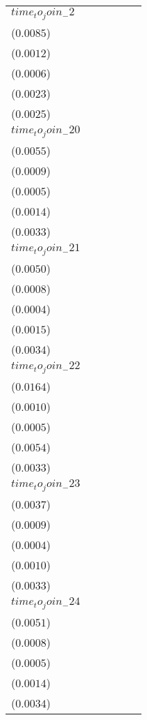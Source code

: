 \begin{tabular}{llllll}
$time_to_join_-2$  &   \makecell{$0.0022^{}$ \\ ($0.0085$)} &  \makecell{$-0.0002^{}$ \\ ($0.0012$)} &  \makecell{$-0.0002^{}$ \\ ($0.0006$)} &   \makecell{$0.0012^{}$ \\ ($0.0023$)} &   \makecell{$0.0020^{}$ \\ ($0.0025$)} \\
$time_to_join_-20$ &   \makecell{$0.0036^{}$ \\ ($0.0055$)} &  \makecell{$-0.0006^{}$ \\ ($0.0009$)} &  \makecell{$-0.0004^{}$ \\ ($0.0005$)} &   \makecell{$0.0011^{}$ \\ ($0.0014$)} &   \makecell{$0.0036^{}$ \\ ($0.0033$)} \\
$time_to_join_-21$ &   \makecell{$0.0015^{}$ \\ ($0.0050$)} &  \makecell{$-0.0002^{}$ \\ ($0.0008$)} &  \makecell{$-0.0001^{}$ \\ ($0.0004$)} &   \makecell{$0.0010^{}$ \\ ($0.0015$)} &   \makecell{$0.0045^{}$ \\ ($0.0034$)} \\
$time_to_join_-22$ &   \makecell{$0.0143^{}$ \\ ($0.0164$)} &   \makecell{$0.0002^{}$ \\ ($0.0010$)} &   \makecell{$0.0000^{}$ \\ ($0.0005$)} &   \makecell{$0.0054^{}$ \\ ($0.0054$)} &   \makecell{$0.0046^{}$ \\ ($0.0033$)} \\
$time_to_join_-23$ &  \makecell{$-0.0005^{}$ \\ ($0.0037$)} &  \makecell{$-0.0005^{}$ \\ ($0.0009$)} &  \makecell{$-0.0002^{}$ \\ ($0.0004$)} &   \makecell{$0.0002^{}$ \\ ($0.0010$)} &   \makecell{$0.0045^{}$ \\ ($0.0033$)} \\
$time_to_join_-24$ &   \makecell{$0.0019^{}$ \\ ($0.0051$)} &  \makecell{$-0.0003^{}$ \\ ($0.0008$)} &  \makecell{$-0.0003^{}$ \\ ($0.0005$)} &   \makecell{$0.0009^{}$ \\ ($0.0014$)} &   \makecell{$0.0043^{}$ \\ ($0.0034$)} \\

\end{tabular}

